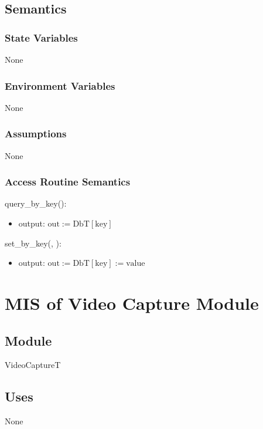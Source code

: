 \documentclass[12pt, titlepage]{article}
\begin{document}
\subsection{Semantics}

\subsubsection{State Variables}
None

\subsubsection{Environment Variables}
None

\subsubsection{Assumptions}
None

\subsubsection{Access Routine Semantics}

\noindent query\_by\_key():
\begin{itemize}
\item output: $\text{out} := \text{DbT}[\text{key}]$
\end{itemize}

\noindent set\_by\_key(, ):
\begin{itemize}
\item output: $\text{out} := \text{DbT}[\text{key}] := \text{value}$

\end{itemize}

\newpage
\color{red}
\section{MIS of Video Capture Module}
\label{VideoCapture:Module}

\subsection{Module}

VideoCaptureT

\subsection{Uses}
None
\end{document}
